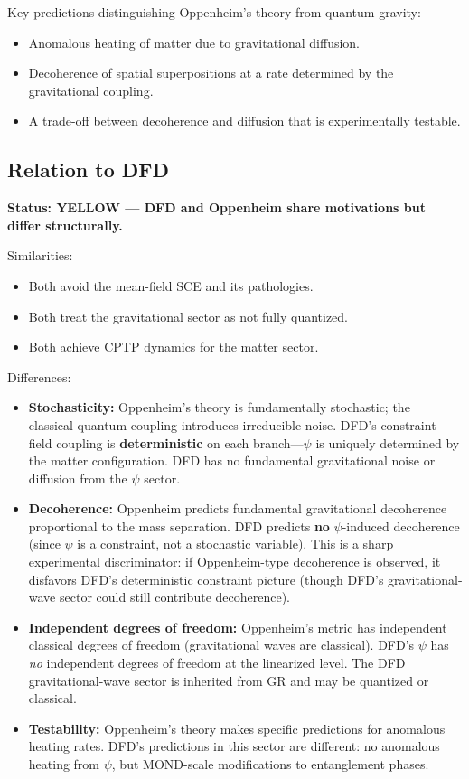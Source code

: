 \documentclass[12pt,a4paper]{article}
\newcommand{\YELLOW}{\textcolor{dfdyellow}{\textbf{YELLOW}}}
\begin{document}
Key predictions distinguishing Oppenheim's theory from quantum gravity:
\begin{itemize}
\item Anomalous heating of matter due to gravitational diffusion.
\item Decoherence of spatial superpositions at a rate determined by the gravitational coupling.
\item A trade-off between decoherence and diffusion that is experimentally testable.
\end{itemize}

\subsection{Relation to DFD}

\textbf{Status: \YELLOW{} --- DFD and Oppenheim share motivations but differ structurally.}

Similarities:
\begin{itemize}
\item Both avoid the mean-field SCE and its pathologies.
\item Both treat the gravitational sector as not fully quantized.
\item Both achieve CPTP dynamics for the matter sector.
\end{itemize}

Differences:
\begin{itemize}
\item \textbf{Stochasticity:} Oppenheim's theory is fundamentally stochastic; the classical-quantum coupling introduces irreducible noise. DFD's constraint-field coupling is \textbf{deterministic} on each branch---$\psi$ is uniquely determined by the matter configuration. DFD has no fundamental gravitational noise or diffusion from the $\psi$ sector.

\item \textbf{Decoherence:} Oppenheim predicts fundamental gravitational decoherence proportional to the mass separation. DFD predicts \textbf{no} $\psi$-induced decoherence (since $\psi$ is a constraint, not a stochastic variable). This is a sharp experimental discriminator: if Oppenheim-type decoherence is observed, it disfavors DFD's deterministic constraint picture (though DFD's gravitational-wave sector could still contribute decoherence).

\item \textbf{Independent degrees of freedom:} Oppenheim's metric has independent classical degrees of freedom (gravitational waves are classical). DFD's $\psi$ has \emph{no} independent degrees of freedom at the linearized level. The DFD gravitational-wave sector is inherited from GR and may be quantized or classical.

\item \textbf{Testability:} Oppenheim's theory makes specific predictions for anomalous heating rates. DFD's predictions in this sector are different: no anomalous heating from $\psi$, but MOND-scale modifications to entanglement phases.
\end{itemize}
\end{document}
